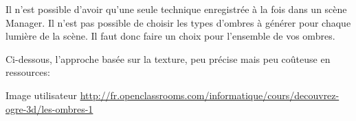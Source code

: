 Il n'est possible d'avoir qu'une seule technique enregistr\'ee \`{a} la fois dans un sc\`ene Manager. Il n'est pas possible de choisir les types d'ombres \`{a} g\'en\'erer pour chaque lumi\`ere de la sc\`ene. Il faut donc faire un choix pour l'ensemble de vos ombres.

Ci-dessous, l'approche bas\'ee sur la texture, peu pr\'ecise mais peu co\^uteuse en ressources:

Image utilisateur \url{http://fr.openclassrooms.com/informatique/cours/decouvrez-ogre-3d/les-ombres-1}

